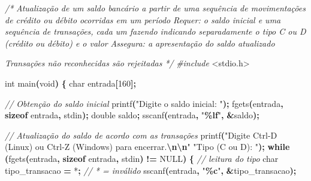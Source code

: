 \documentclass[
  11pt,
  a4paper,
]{scrbook}
\newenvironment{Shaded}{\begin{snugshade}}{\end{snugshade}}
\newcommand{\CharTok}[1]{\textcolor[rgb]{0.31,0.60,0.02}{#1}}
\newcommand{\CommentTok}[1]{\textcolor[rgb]{0.56,0.35,0.01}{\textit{#1}}}
\newcommand{\ControlFlowTok}[1]{\textcolor[rgb]{0.13,0.29,0.53}{\textbf{#1}}}
\newcommand{\DataTypeTok}[1]{\textcolor[rgb]{0.13,0.29,0.53}{#1}}
\newcommand{\DecValTok}[1]{\textcolor[rgb]{0.00,0.00,0.81}{#1}}
\newcommand{\ImportTok}[1]{#1}
\newcommand{\KeywordTok}[1]{\textcolor[rgb]{0.13,0.29,0.53}{\textbf{#1}}}
\newcommand{\NormalTok}[1]{#1}
\newcommand{\OperatorTok}[1]{\textcolor[rgb]{0.81,0.36,0.00}{\textbf{#1}}}
\newcommand{\PreprocessorTok}[1]{\textcolor[rgb]{0.56,0.35,0.01}{\textit{#1}}}
\newcommand{\SpecialCharTok}[1]{\textcolor[rgb]{0.81,0.36,0.00}{\textbf{#1}}}
\newcommand{\StringTok}[1]{\textcolor[rgb]{0.31,0.60,0.02}{#1}}
\begin{document}
\begin{Shaded}
\begin{Highlighting}[]
\CommentTok{/*}
\CommentTok{Atualização de um saldo bancário a partir de uma sequência de movimentações de crédito ou débito ocorridas em um período}
\CommentTok{Requer: o saldo inicial e uma sequência de transações, cada um fazendo indicando separadamente o tipo \textquotesingle{}C\textquotesingle{} ou \textquotesingle{}D\textquotesingle{} (crédito ou débito) e o valor}
\CommentTok{Assegura: a apresentação do saldo atualizado}

\CommentTok{Transações não reconhecidas são rejeitadas}
\CommentTok{*/}
\PreprocessorTok{\#include }\ImportTok{\textless{}stdio.h\textgreater{}}

\DataTypeTok{int}\NormalTok{ main}\OperatorTok{(}\DataTypeTok{void}\OperatorTok{)} \OperatorTok{\{}
    \DataTypeTok{char}\NormalTok{ entrada}\OperatorTok{[}\DecValTok{160}\OperatorTok{];}

    \CommentTok{// Obtenção do saldo inicial}
\NormalTok{    printf}\OperatorTok{(}\StringTok{"Digite o saldo inicial: "}\OperatorTok{);}
\NormalTok{    fgets}\OperatorTok{(}\NormalTok{entrada}\OperatorTok{,} \KeywordTok{sizeof}\NormalTok{ entrada}\OperatorTok{,}\NormalTok{ stdin}\OperatorTok{);}
    \DataTypeTok{double}\NormalTok{ saldo}\OperatorTok{;}
\NormalTok{    sscanf}\OperatorTok{(}\NormalTok{entrada}\OperatorTok{,} \StringTok{"}\SpecialCharTok{\%lf}\StringTok{"}\OperatorTok{,} \OperatorTok{\&}\NormalTok{saldo}\OperatorTok{);}

    \CommentTok{// Atualização do saldo de acordo com as transações}
\NormalTok{    printf}\OperatorTok{(}\StringTok{"Digite Ctrl{-}D (Linux) ou Ctrl{-}Z (Windows) para encerrar.}\SpecialCharTok{\textbackslash{}n\textbackslash{}n}\StringTok{"}
           \StringTok{"Tipo (C ou D): "}\OperatorTok{);}
    \ControlFlowTok{while} \OperatorTok{(}\NormalTok{fgets}\OperatorTok{(}\NormalTok{entrada}\OperatorTok{,} \KeywordTok{sizeof}\NormalTok{ entrada}\OperatorTok{,}\NormalTok{ stdin}\OperatorTok{)} \OperatorTok{!=}\NormalTok{ NULL}\OperatorTok{)} \OperatorTok{\{}  \CommentTok{// leitura do tipo}
        \DataTypeTok{char}\NormalTok{ tipo\_transacao }\OperatorTok{=} \CharTok{\textquotesingle{}*\textquotesingle{}}\OperatorTok{;}  \CommentTok{// \textquotesingle{}*\textquotesingle{} = inválido}
\NormalTok{        sscanf}\OperatorTok{(}\NormalTok{entrada}\OperatorTok{,} \StringTok{"}\SpecialCharTok{\%c}\StringTok{"}\OperatorTok{,} \OperatorTok{\&}\NormalTok{tipo\_transacao}\OperatorTok{);}


\end{Highlighting}
\end{Shaded}
\end{document}
